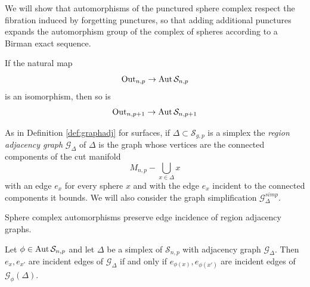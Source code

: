 \aramsouto*

We will show that automorphisms of the punctured sphere complex
respect the fibration induced by forgetting punctures,
so that adding additional punctures expands the automorphism group
of the complex of spheres according to a Birman exact sequence.

\begin{theorem}
  If the natural map
  $$
  \operatorname{Out}_{n,p} \to  \operatorname{Aut} \mathcal  S_{n,p}
  $$
  is an isomorphism, then so is
  $$
  \operatorname{Out}_{n,p+1} \to  \operatorname{Aut} \mathcal  S_{n,p+1}
  $$
  \label{thm:outpunc}
\end{theorem}

\begin{definition}
  As in Definition \ref{def:graphadj} for surfaces, if
   $\Delta \subset \mathcal S_{g,p}$ is a simplex
  the \emph{region adjacency graph}
  $\mathcal G_\Delta$
  of $\Delta$
  is the graph whose vertices are the connected components
  of the cut manifold
  $$
  M_{n,p} - \bigcup_{x \in \Delta} x
  $$
  with an edge $e_x$ for every sphere $x$ and with
  the edge $e_x$ incident to the connected components it bounds.
  We will also consider the graph simplification
  $\mathcal G^{simp}_\Delta$.
\end{definition}

\begin{lemma}
  Sphere complex automorphisms preserve edge incidence of region adjacency graphs.

  Let $\phi \in \operatorname{Aut} \mathcal S_{n,p}$ and let $\Delta$ be a simplex of $\mathcal S_{n,p}$ with adjacency graph $\mathcal G_\Delta$.
  Then $e_x, e_{x'}$ are incident edges of $\mathcal G_\Delta$
  if and only if $e_{\phi(x)}, e_{\phi(x')}$ are incident
  edges of $\mathcal G_\phi(\Delta)$.
  \label{lemma:outlinegraph}
\end{lemma}

